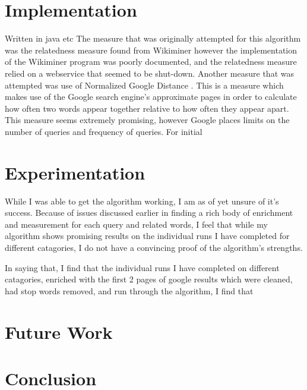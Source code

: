 \documentclass[letterpaper]{article}
\begin{document}
\section{Implementation}

Written in java etc
The measure that was originally attempted for this algorithm was the relatedness measure found from Wikiminer \cite{wikiminer} however the implementation of the Wikiminer program was poorly documented, and the relatedness measure relied on a webservice that seemed to be shut-down. Another measure that was attempted was use of Normalized Google Distance \cite{NGD}. This is a measure which makes use of the 
Google search engine's approximate pages in order to calculate how often two words appear together relative to how often they appear apart. This measure seems extremely promising, however
Google places limits on the number of queries and frequency of queries. For initial 


\section{Experimentation}

While I was able to get the algorithm working, I am as of yet unsure of it's success.
Because of issues discussed earlier in finding a rich body of enrichment and measurement for each query and related words, I feel that while my algorithm shows promising results
on the individual runs I have completed for different catagories, I do not have a convincing proof of the algorithm's strengths.

In saying that, I find that the individual runs I have completed on different catagories, enriched with the first 2 pages of google results which were cleaned, had stop words removed,
and run through the algorithm, I find that 

\section{Future Work}

\section{Conclusion}


%
%
\end{document}
